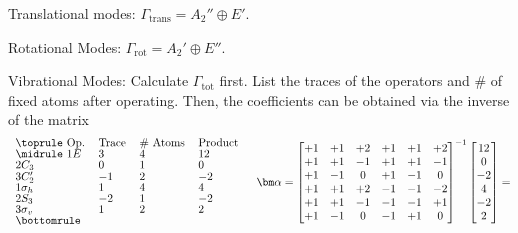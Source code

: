 \pagebreak
\begin{solution}\leavevmode
  \begin{enumext}
    \item
    \begin{enumext}
      \item Translational modes: $\Gamma_\text{trans} = A_2'' \oplus E'$.
      \item Rotational Modes: $\Gamma_\text{rot} = A_2' \oplus E''$.
      \item Vibrational Modes: Calculate $\Gamma_\text{tot}$ first.
      List the traces of the operators and \# of fixed atoms after operating.
      Then, the coefficients can be obtained via the inverse of the matrix
      \[
        \begingroup
        \renewcommand *\arraystretch{.8}
        \begin{tabular}{*4l}
          \toprule
          Op.         & Trace & \# Atoms & Product\\
          \midrule
          $1E$        & $3$   & $4$      & $12$   \\
          $2C_3$      & $0$   & $1$      & $0$    \\
          $3C_2'$     & $-1$  & $2$      & $-2$   \\
          $1\sigma_h$ & $1$   & $4$      & $4$    \\
          $2S_3$      & $-2$  & $1$      & $-2$   \\
          $3\sigma_v$ & $1$   & $2$      & $2$    \\
          \bottomrule
        \end{tabular}
        \endgroup\quad
        \bm\alpha =
          \begin{bmatrix}
            +1 & +1 & +2 & +1 & +1 & +2\\
            +1 & +1 & -1 & +1 & +1 & -1\\
            +1 & -1 &  0 & +1 & -1 &  0\\
            +1 & +1 & +2 & -1 & -1 & -2\\
            +1 & +1 & -1 & -1 & -1 & +1\\
            +1 & -1 &  0 & -1 & +1 &  0
          \end{bmatrix}^{-1}
          \begin{bmatrix}
            12\\0\\-2\\4\\-2\\2
          \end{bmatrix} =
\]
\end{enumext}
\end{enumext}
\end{solution}
